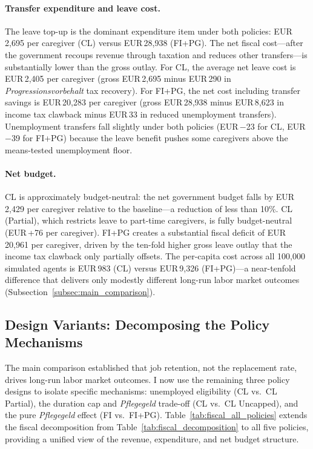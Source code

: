 \paragraph{Transfer expenditure and leave cost.} The leave top-up is the dominant expenditure item under both policies: EUR\,2,695 per caregiver (CL) versus EUR\,28,938 (FI+PG). The net fiscal cost---after the government recoups revenue through taxation and reduces other transfers---is substantially lower than the gross outlay. For CL, the average net leave cost is EUR\,2,405 per caregiver (gross EUR\,2,695 minus EUR\,290 in \textit{Progressionsvorbehalt} tax recovery). For FI+PG, the net cost including transfer savings is EUR\,20,283 per caregiver (gross EUR\,28,938 minus EUR\,8,623 in income tax clawback minus EUR\,33 in reduced unemployment transfers). Unemployment transfers fall slightly under both policies (EUR\,$-$23 for CL, EUR\,$-$39 for FI+PG) because the leave benefit pushes some caregivers above the means-tested unemployment floor.

\paragraph{Net budget.} CL is approximately budget-neutral: the net government budget falls by EUR\,2,429 per caregiver relative to the baseline---a reduction of less than 10\%. CL (Partial), which restricts leave to part-time caregivers, is fully budget-neutral (EUR\,+76 per caregiver). FI+PG creates a substantial fiscal deficit of EUR\,20,961 per caregiver, driven by the ten-fold higher gross leave outlay that the income tax clawback only partially offsets. The per-capita cost across all 100,000 simulated agents is EUR\,983 (CL) versus EUR\,9,326 (FI+PG)---a near-tenfold difference that delivers only modestly different long-run labor market outcomes (Subsection~\ref{subsec:main_comparison}).

\subsection{Design Variants: Decomposing the Policy Mechanisms}
\label{subsec:design_variants}

The main comparison established that job retention, not the replacement rate, drives long-run labor market outcomes. I now use the remaining three policy designs to isolate specific mechanisms: unemployed eligibility (CL vs.\ CL Partial), the duration cap and \textit{Pflegegeld} trade-off (CL vs.\ CL Uncapped), and the pure \textit{Pflegegeld} effect (FI vs.\ FI+PG). Table~\ref{tab:fiscal_all_policies} extends the fiscal decomposition from Table~\ref{tab:fiscal_decomposition} to all five policies, providing a unified view of the revenue, expenditure, and net budget structure.

